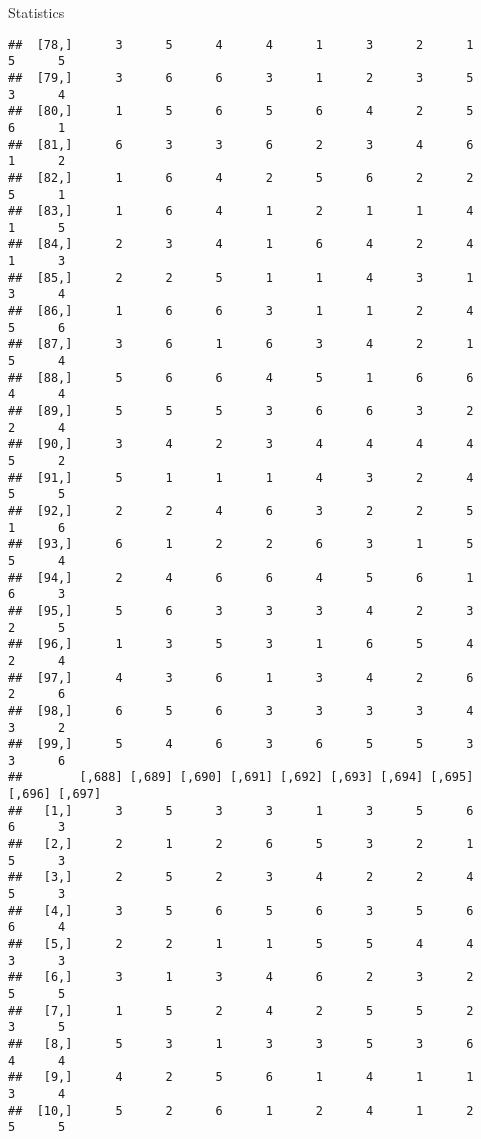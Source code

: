 \documentclass[
  ignorenonframetext,
]{beamer}
\begin{document}
\begin{frame}[fragile]{Statistics}
\begin{verbatim}
##  [78,]      3      5      4      4      1      3      2      1      5      5
##  [79,]      3      6      6      3      1      2      3      5      3      4
##  [80,]      1      5      6      5      6      4      2      5      6      1
##  [81,]      6      3      3      6      2      3      4      6      1      2
##  [82,]      1      6      4      2      5      6      2      2      5      1
##  [83,]      1      6      4      1      2      1      1      4      1      5
##  [84,]      2      3      4      1      6      4      2      4      1      3
##  [85,]      2      2      5      1      1      4      3      1      3      4
##  [86,]      1      6      6      3      1      1      2      4      5      6
##  [87,]      3      6      1      6      3      4      2      1      5      4
##  [88,]      5      6      6      4      5      1      6      6      4      4
##  [89,]      5      5      5      3      6      6      3      2      2      4
##  [90,]      3      4      2      3      4      4      4      4      5      2
##  [91,]      5      1      1      1      4      3      2      4      5      5
##  [92,]      2      2      4      6      3      2      2      5      1      6
##  [93,]      6      1      2      2      6      3      1      5      5      4
##  [94,]      2      4      6      6      4      5      6      1      6      3
##  [95,]      5      6      3      3      3      4      2      3      2      5
##  [96,]      1      3      5      3      1      6      5      4      2      4
##  [97,]      4      3      6      1      3      4      2      6      2      6
##  [98,]      6      5      6      3      3      3      3      4      3      2
##  [99,]      5      4      6      3      6      5      5      3      3      6
##        [,688] [,689] [,690] [,691] [,692] [,693] [,694] [,695] [,696] [,697]
##   [1,]      3      5      3      3      1      3      5      6      6      3
##   [2,]      2      1      2      6      5      3      2      1      5      3
##   [3,]      2      5      2      3      4      2      2      4      5      3
##   [4,]      3      5      6      5      6      3      5      6      6      4
##   [5,]      2      2      1      1      5      5      4      4      3      3
##   [6,]      3      1      3      4      6      2      3      2      5      5
##   [7,]      1      5      2      4      2      5      5      2      3      5
##   [8,]      5      3      1      3      3      5      3      6      4      4
##   [9,]      4      2      5      6      1      4      1      1      3      4
##  [10,]      5      2      6      1      2      4      1      2      5      5

\end{verbatim}
\end{frame}
\end{document}
